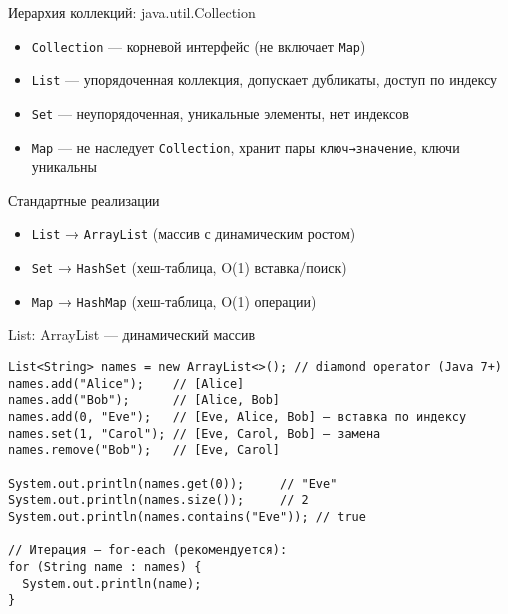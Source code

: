\documentclass[aspectratio=169]{beamer}
\begin{document}
\begin{frame}{Иерархия коллекций: java.util.Collection}
  \begin{itemize}
    \item \texttt{Collection} — корневой интерфейс (не включает \texttt{Map})
    \item \texttt{List} — упорядоченная коллекция, допускает дубликаты, доступ по индексу
    \item \texttt{Set} — неупорядоченная, уникальные элементы, нет индексов
    \item \texttt{Map} — не наследует \texttt{Collection}, хранит пары \texttt{ключ→значение}, ключи уникальны
  \end{itemize}
  \begin{block}{Стандартные реализации}
    \begin{itemize}
      \item \texttt{List} → \texttt{ArrayList} (массив с динамическим ростом)
      \item \texttt{Set} → \texttt{HashSet} (хеш-таблица, O(1) вставка/поиск)
      \item \texttt{Map} → \texttt{HashMap} (хеш-таблица, O(1) операции)
    \end{itemize}
  \end{block}
\end{frame}

\begin{frame}[fragile]{List: ArrayList — динамический массив}
\lstset{language=JavaLite}
\begin{lstlisting}
List<String> names = new ArrayList<>(); // diamond operator (Java 7+)
names.add("Alice");    // [Alice]
names.add("Bob");      // [Alice, Bob]
names.add(0, "Eve");   // [Eve, Alice, Bob] — вставка по индексу
names.set(1, "Carol"); // [Eve, Carol, Bob] — замена
names.remove("Bob");   // [Eve, Carol]

System.out.println(names.get(0));     // "Eve"
System.out.println(names.size());     // 2
System.out.println(names.contains("Eve")); // true

// Итерация — for-each (рекомендуется):
for (String name : names) {
  System.out.println(name);
}
\end{lstlisting}
\end{frame}
\end{document}

